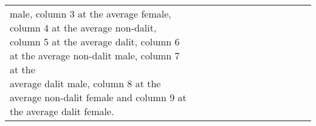 \begin{table}[!h]
{\begin{tabular}{lcccccccccccc}
{	male, column 3 at the average female, column 4 at the average non-dalit, column 5 at the average dalit, column 6 at the average non-dalit male, column 7 at the \\ 
	average dalit male, column 8 at the average non-dalit female and column 9 at the average dalit female.} \\
    \end{tabular}%
	}
  \label{tab:ame_fe_dsr}%
\end{table}%

